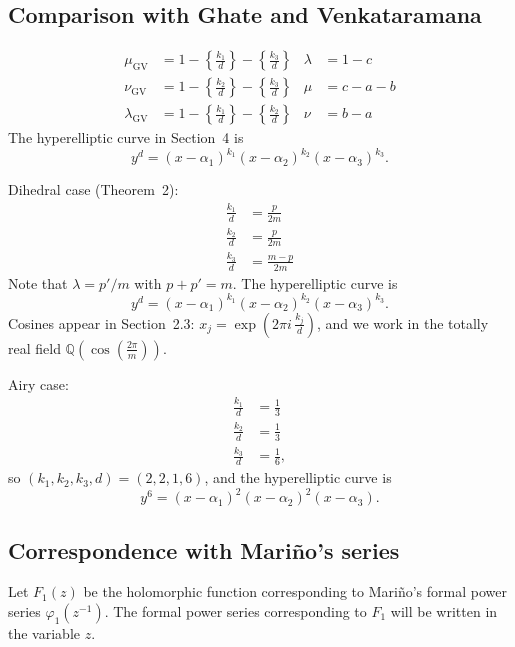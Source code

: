 \documentclass{article}
\theoremstyle{plain}
\begin{document}
\subsection{Comparison with Ghate and Venkataramana}
\begin{align*}
\mu_\text{GV} & = 1 - \left\{\frac{k_1}{d}\right\} - \left\{\frac{k_3}{d}\right\} & \lambda & = 1 - c \\
\nu_\text{GV} & = 1 - \left\{\frac{k_2}{d}\right\} - \left\{\frac{k_3}{d}\right\} & \mu & = c - a - b \\
\lambda_\text{GV} & = 1 - \left\{\frac{k_1}{d}\right\} - \left\{\frac{k_2}{d}\right\} & \nu & = b - a
\end{align*}
The hyperelliptic curve in Section~4 is
\[ y^d = (x - \alpha_1)^{k_1} (x - \alpha_2)^{k_2} (x - \alpha_3)^{k_3}. \]

Dihedral case (Theorem~2):
\begin{align*}
\frac{k_1}{d} & = \frac{p}{2m} \\
\frac{k_2}{d} & = \frac{p}{2m} \\
\frac{k_3}{d} & = \frac{m - p}{2m}
\end{align*}
Note that $\lambda = p'/m$ with $p + p' = m$. The hyperelliptic curve is
\[ y^d = (x - \alpha_1)^{k_1} (x - \alpha_2)^{k_2} (x - \alpha_3)^{k_3}. \]
Cosines appear in Section~2.3: $x_j = \exp(2\pi i\,\tfrac{k_j}{d})$, and we work in the totally real field $\mathbb{Q}(\cos(\frac{2\pi}{m}))$.

Airy case:
\begin{align*}
\frac{k_1}{d} & = \frac{1}{3} \\
\frac{k_2}{d} & = \frac{1}{3} \\
\frac{k_3}{d} & = \frac{1}{6},
\end{align*}
so $(k_1, k_2, k_3, d) = (2, 2, 1, 6)$, and the hyperelliptic curve is
\[ y^6 = (x - \alpha_1)^2 (x - \alpha_2)^2 (x - \alpha_3). \]
\subsection{Correspondence with Mari\~{n}o's series}
Let $F_1(z)$ be the holomorphic function corresponding to Mari\~{n}o's formal power series $\varphi_1(z^{-1})$. The formal power series corresponding to $F_1$ will be written in the variable $z$.
\end{document}
